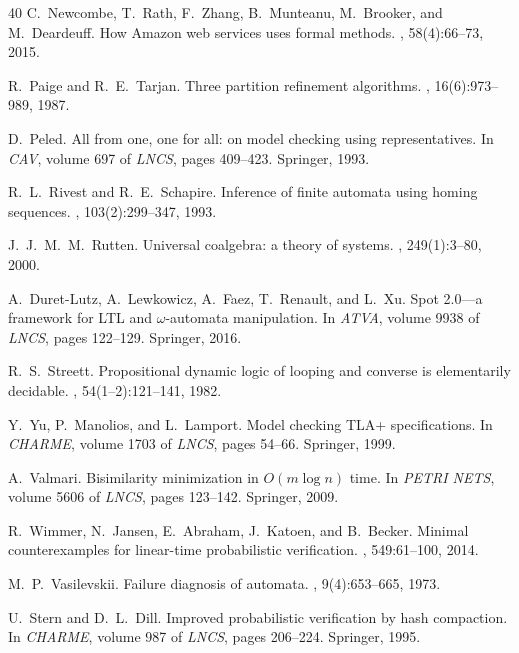 \documentclass[11pt]{article}
\begin{document}
\begin{thebibliography}{40}
C.~Newcombe, T.~Rath, F.~Zhang, B.~Munteanu, M.~Brooker, and M.~Deardeuff.
\newblock How {Amazon} web services uses formal methods.
, 58(4):66--73, 2015.

R.~Paige and R.~E.~Tarjan.
\newblock Three partition refinement algorithms.
, 16(6):973--989, 1987.

D.~Peled.
\newblock All from one, one for all: on model checking using representatives.
\newblock In {\em CAV}, volume 697 of {\em LNCS}, pages 409--423. Springer,
  1993.

R.~L.~Rivest and R.~E.~Schapire.
\newblock Inference of finite automata using homing sequences.
, 103(2):299--347, 1993.

J.~J.~M.~M.~Rutten.
\newblock Universal coalgebra: a theory of systems.
, 249(1):3--80, 2000.

A.~Duret-Lutz, A.~Lewkowicz, A.~Faez, T.~Renault, and L.~Xu.
\newblock Spot 2.0---a framework for {LTL} and $\omega$-automata
  manipulation.
\newblock In {\em ATVA}, volume 9938 of {\em LNCS}, pages 122--129. Springer,
  2016.

R.~S.~Streett.
\newblock Propositional dynamic logic of looping and converse is elementarily
  decidable.
, 54(1--2):121--141, 1982.

Y.~Yu, P.~Manolios, and L.~Lamport.
\newblock Model checking {TLA+} specifications.
\newblock In {\em CHARME}, volume 1703 of {\em LNCS}, pages 54--66. Springer,
  1999.

A.~Valmari.
\newblock Bisimilarity minimization in $O(m \log n)$ time.
\newblock In {\em PETRI NETS}, volume 5606 of {\em LNCS}, pages 123--142.
  Springer, 2009.

R.~Wimmer, N.~Jansen, E.~Abraham, J.~Katoen, and B.~Becker.
\newblock Minimal counterexamples for linear-time probabilistic verification.
, 549:61--100, 2014.

M.~P.~Vasilevskii.
\newblock Failure diagnosis of automata.
, 9(4):653--665, 1973.

U.~Stern and D.~L.~Dill.
\newblock Improved probabilistic verification by hash compaction.
\newblock In {\em CHARME}, volume 987 of {\em LNCS}, pages 206--224. Springer,
  1995.

\end{thebibliography}
\end{document}
